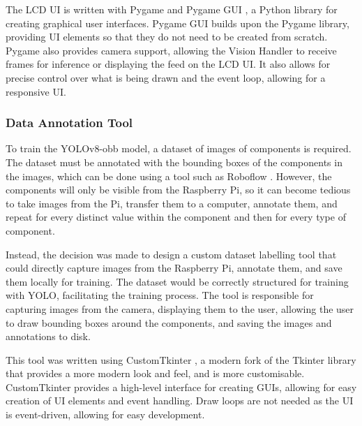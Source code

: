 The LCD UI is written with Pygame \cite{pygamedoc} and Pygame GUI \cite{pygamegui}, a Python library for creating graphical user interfaces. Pygame GUI builds upon the Pygame library, providing UI elements so that they do not need to be created from scratch. Pygame also provides camera support, allowing the Vision Handler to receive frames for inference or displaying the feed on the LCD UI. It also allows for precise control over what is being drawn and the event loop, allowing for a responsive UI.

\subsubsection{Data Annotation Tool}
\label{sec:data-annotation-tool}
To train the YOLOv8-obb model, a dataset of images of components is required. The dataset must be annotated with the bounding boxes of the components in the images, which can be done using a tool such as Roboflow \cite{roboflow}. However, the components will only be visible from the Raspberry Pi, so it can become tedious to take images from the Pi, transfer them to a computer, annotate them, and repeat for every distinct value within the component and then for every type of component.

Instead, the decision was made to design a custom dataset labelling tool that could directly capture images from the Raspberry Pi, annotate them, and save them locally for training. The dataset would be correctly structured for training with YOLO, facilitating the training process. The tool is responsible for capturing images from the camera, displaying them to the user, allowing the user to draw bounding boxes around the components, and saving the images and annotations to disk.

This tool was written using CustomTkinter \cite{customtkinter}, a modern fork of the Tkinter library that provides a more modern look and feel, and is more customisable. CustomTkinter provides a high-level interface for creating GUIs, allowing for easy creation of UI elements and event handling. Draw loops are not needed as the UI is event-driven, allowing for easy development.

